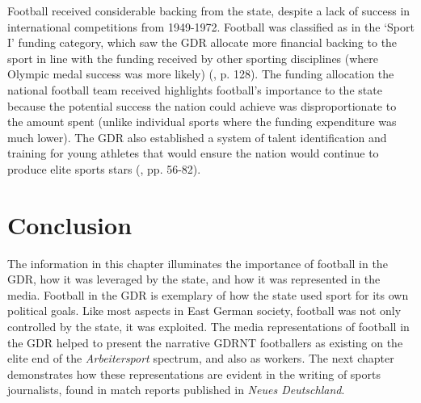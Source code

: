 Football received considerable backing from the state, despite a lack of success in international competitions from 1949-1972. Football was classified as in the ‘Sport I’ funding category, which saw the GDR allocate more financial backing to the sport in line with the funding received by other sporting disciplines (where Olympic medal success was more likely) (\cite{dennisgrix2012}, p. 128). The funding allocation the national football team received highlights football’s importance to the state because the potential success the nation could achieve was disproportionate to the amount spent (unlike individual sports where the funding expenditure was much lower). The GDR also established a system of talent identification and training for young athletes that would ensure the nation would continue to produce elite sports stars (\cite{dennisgrix2012}, pp. 56-82).

\section*{Conclusion}

The information in this chapter illuminates the importance of football in the GDR, how it was leveraged by the state, and how it was represented in the media. Football in the GDR is exemplary of how the state used sport for its own political goals. Like most aspects in East German society, football was not only controlled by the state, it was exploited. The media representations of football in the GDR helped to present the narrative GDRNT footballers as existing on the elite end of the \textit{Arbeitersport} spectrum, and also as workers. The next chapter demonstrates how these representations are evident in the writing of sports journalists, found in match reports published in \textit{Neues Deutschland}.